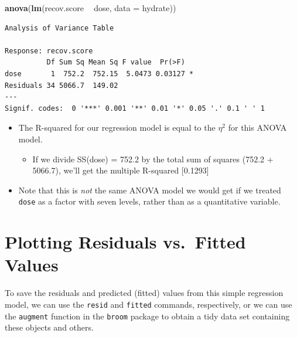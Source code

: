 \documentclass[
]{book}
\newenvironment{Shaded}{\begin{snugshade}}{\end{snugshade}}
\newcommand{\DataTypeTok}[1]{\textcolor[rgb]{0.13,0.29,0.53}{#1}}
\newcommand{\KeywordTok}[1]{\textcolor[rgb]{0.13,0.29,0.53}{\textbf{#1}}}
\newcommand{\NormalTok}[1]{#1}
\newcommand{\OperatorTok}[1]{\textcolor[rgb]{0.81,0.36,0.00}{\textbf{#1}}}
\newcommand{\StringTok}[1]{\textcolor[rgb]{0.31,0.60,0.02}{#1}}
\providecommand{\tightlist}{%
  \setlength{\itemsep}{0pt}\setlength{\parskip}{0pt}}
\begin{document}
\begin{Shaded}
\begin{Highlighting}[]
\KeywordTok{anova}\NormalTok{(}\KeywordTok{lm}\NormalTok{(recov.score }\OperatorTok{~}\StringTok{ }\NormalTok{dose, }\DataTypeTok{data =}\NormalTok{ hydrate))}
\end{Highlighting}
\end{Shaded}

\begin{verbatim}
Analysis of Variance Table

Response: recov.score
          Df Sum Sq Mean Sq F value  Pr(>F)  
dose       1  752.2  752.15  5.0473 0.03127 *
Residuals 34 5066.7  149.02                  
---
Signif. codes:  0 '***' 0.001 '**' 0.01 '*' 0.05 '.' 0.1 ' ' 1
\end{verbatim}

\begin{itemize}
\tightlist
\item
  The R-squared for our regression model is equal to the \(\eta^2\) for this ANOVA model.

  \begin{itemize}
  \tightlist
  \item
    If we divide SS(dose) = 752.2 by the total sum of squares (752.2 + 5066.7), we'll get the multiple R-squared {[}0.1293{]}
  \end{itemize}
\item
  Note that this is \emph{not} the same ANOVA model we would get if we treated \texttt{dose} as a factor with seven levels, rather than as a quantitative variable.
\end{itemize}

\hypertarget{plotting-residuals-vs.-fitted-values}{%
\section{Plotting Residuals vs.~Fitted Values}\label{plotting-residuals-vs.-fitted-values}}

To save the residuals and predicted (fitted) values from this simple regression model, we can use the \texttt{resid} and \texttt{fitted} commands, respectively, or we can use the \texttt{augment} function in the \texttt{broom} package to obtain a tidy data set containing these objects and others.
\end{document}
